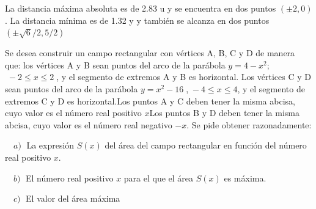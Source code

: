 \begin{proofw}
\begin{multicols}{2}
	La distancia máxima absoluta es de 2.83 u y se encuentra en dos puntos $(\pm2,0)$. 	La distancia mínima es de 1.32 y y también se alcanza en dos puntos $(\pm \sqrt{6}/2, 5/2)$
	
	\end{multicols}
	
	\end{proofw}

	\begin{ejre} Se desea construir un campo rectangular con vértices A, B, C y D de manera que: los vértices A y B sean puntos del arco de la parábola $y=4-x^2$; $\; -2\le x\le 2\; $, y el segmento de extremos A y B es horizontal. Los vértices C y D sean puntos del arco de la parábola $y=x^2-16\; $,$\; -4\le x\le 4$, y el segmento de extremos C y  D es horizontal.Los puntos A y C deben tener la misma abcisa, cuyo valor es el número real positivo $x$Los puntos B y D deben tener la misma abcisa, cuyo valor es el número real negativo $-x$. Se pide obtener razonadamente:
 
	$\quad a) \; $ La expresión $S(x)$ del área del campo rectangular en función del número real positivo $x$. 
	
	$\quad b) \; $ El número real positivo $x$ para el que el área $S(x)$ es máxima.  
	
	$\quad c) \;$ El valor del área máxima	
	
	\end{ejre}

